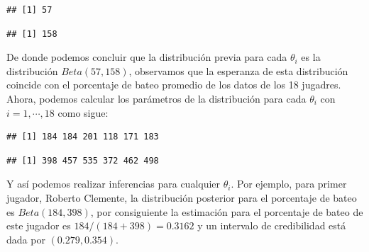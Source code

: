 \begin{Eje}
\begin{knitrout}
\begin{kframe}
{\ttfamily\noindent\itshape\color{messagecolor}{\#\# hurdle and zeroinfl functions by Achim Zeileis}}\begin{alltt}
 \hlkwb{<-}  
 \hlkwb{<-} 
 \hlkwb{<-} 
 \hlkwb{<-} 
 \hlkwb{<-} \hlopt{*}\hlopt{*}\hlstd{(}\hlopt{-}\hlopt{-}\hlopt{/}\hlopt{-}\hlopt{*}\hlstd{(}\hlopt{-}\hlopt{/}
 \hlkwb{<-} \hlstd{(}\hlopt{-}\hlopt{*}\hlopt{*}\hlstd{(}\hlopt{-}\hlopt{-}\hlopt{/}\hlopt{-}\hlopt{*}\hlstd{(}\hlopt{-}\hlopt{/}
\end{alltt}
\begin{verbatim}
## [1] 57
\end{verbatim}
\begin{alltt}
\end{alltt}
\begin{verbatim}
## [1] 158
\end{verbatim}
\end{kframe}
\end{knitrout}
De donde podemos concluir que la distribución previa para cada $\theta_i$ es la distribución $Beta(57, 158)$, observamos que la esperanza de esta distribución coincide con el porcentaje de bateo promedio de los datos de los 18 jugadres. Ahora, podemos calcular los parámetros de la distribución para cada $\theta_i$ con $i=1,\cdots,18$ como sigue:
\begin{knitrout}
\color{fgcolor}\begin{kframe}
\begin{alltt}
 \hlkwb{<-}  \hlopt{+} \hlopt{*}
 \hlkwb{<-}  \hlopt{+} \hlstd{(}\hlopt{-}\hlopt{*}
\end{alltt}
\begin{verbatim}
## [1] 184 184 201 118 171 183
\end{verbatim}
\begin{alltt}
\end{alltt}
\begin{verbatim}
## [1] 398 457 535 372 462 498
\end{verbatim}
\end{kframe}
\end{knitrout}
Y así podemos realizar inferencias para cualquier $\theta_i$. Por ejemplo, para primer jugador, Roberto Clemente, la distribución posterior para el porcentaje de bateo es $Beta(184, 398)$, por consiguiente la estimación para el porcentaje de bateo de este jugador es $184/(184+398)=0.3162$ y un intervalo de credibilidad está dada por $(0.279,0.354)$. 
\end{Eje}

